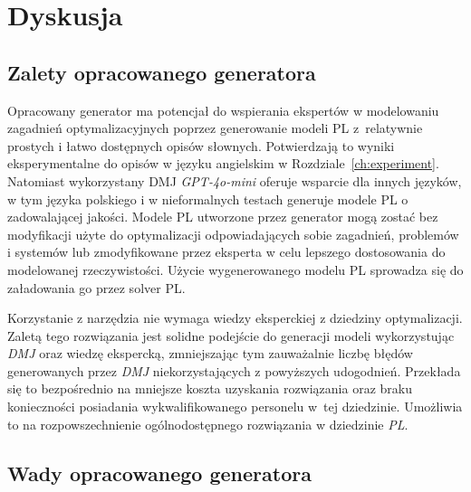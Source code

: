 
\chapter{Dyskusja}\label{ch:discussion}

\section{Zalety opracowanego generatora}

Opracowany generator ma potencjał do wspierania ekspertów w modelowaniu zagadnień optymalizacyjnych poprzez generowanie modeli PL z~relatywnie prostych i łatwo dostępnych opisów słownych. Potwierdzają to wyniki eksperymentalne do opisów w języku angielskim w Rozdziale~\ref{ch:experiment}. Natomiast wykorzystany DMJ \textit{GPT-4o-mini} oferuje wsparcie dla innych języków, w tym języka polskiego i w nieformalnych testach generuje modele PL o zadowalającej jakości.
Modele PL utworzone przez generator mogą zostać bez modyfikacji użyte do optymalizacji odpowiadających sobie zagadnień, problemów i systemów lub zmodyfikowane przez eksperta w celu lepszego dostosowania do modelowanej rzeczywistości. Użycie wygenerowanego modelu PL sprowadza się do załadowania go przez solver PL.

Korzystanie z narzędzia nie wymaga wiedzy eksperckiej z dziedziny optymalizacji. Zaletą tego rozwiązania jest solidne podejście do generacji modeli wykorzystując \textit{DMJ} oraz wiedzę ekspercką, zmniejszając tym zauważalnie liczbę błędów generowanych przez \textit{DMJ} niekorzystających z powyższych udogodnień. Przekłada się to bezpośrednio na mniejsze koszta uzyskania rozwiązania oraz braku konieczności posiadania wykwalifikowanego personelu w~tej dziedzinie. Umożliwia to na rozpowszechnienie ogólnodostępnego rozwiązania w dziedzinie \textit{PL}. 


\section{Wady opracowanego generatora}

